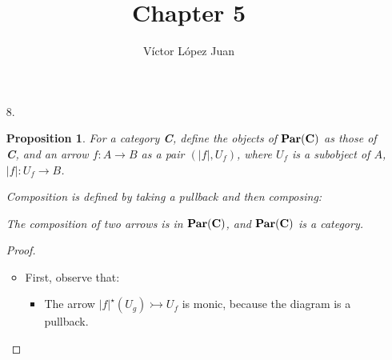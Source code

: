 \documentclass[a4paper,notitlepage]{article}
\author{Víctor López Juan}
\title{Chapter 5}
\newtheorem{proposition}{Proposition}
\begin{document}
\maketitle
\begin{enumerate}

  \item[8.]

    \begin{proposition}
      
    For a category {\bf C}, define the objects of $\text{\bf Par}(\text{\bf C})$
    as those of {\bf C}, and an arrow $f : A → B$ as a pair $(\vert f \vert, U_f)$,
    where $U_f$ is a subobject of $A$,  $\vert f \vert : U_f → B$.

    Composition is defined by taking a pullback and then composing:

           


    The composition of two arrows is in $\text{\bf Par}(\text{\bf C})$, and
    $\text{\bf Par}(\text{\bf C})$ is a category.

    \end{proposition}

    \begin{proof}
    \begin{itemize}
      \item

        
        First, observe that:
        
      \begin{itemize}
        \item The arrow $\vert f \vert^\star (U_g) \rightarrowtail U_f$
          is monic, because the diagram is a pullback.


\end{itemize}
\end{itemize}
\end{proof}
\end{enumerate}
\end{document}
